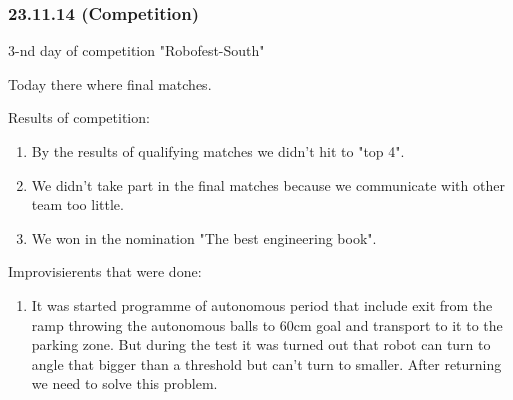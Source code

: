 \subsubsection{23.11.14 (Competition)}
\begin{center}
	 3-nd day of competition "Robofest-South"
\end{center}
Today there where final matches.

Results of competition:
\begin{enumerate}
	\item By the results of qualifying matches we didn't hit to "top 4".
	
	\item We didn't take part in the final matches because we communicate with other team too little.
	
	\item We won in the nomination "The best engineering book".
\end{enumerate}

Improvisierents that were done:
\begin{enumerate}
	\item It was started programme of autonomous period that include exit from the ramp throwing the autonomous balls to 60cm goal and transport to it to the parking zone. But during the test it was turned out that robot can turn to angle that bigger than a threshold but can't turn to smaller. After returning we need to solve this problem.
\end{enumerate}

